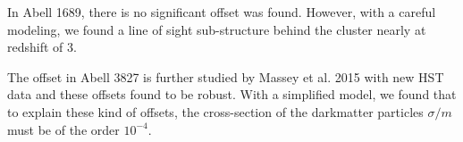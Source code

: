 In Abell 1689, there is no significant offset was found. However, with a careful
modeling, we found a line of sight sub-structure behind the cluster nearly at
redshift of 3. 

The offset in Abell 3827 is further studied by Massey et al. 2015 with new HST
data and these offsets found to be robust. With a simplified model, we found that
to explain these kind of offsets, the cross-section of the darkmatter particles 
$\sigma/m$ must be of the order $10^{-4}$.


\clearpage

